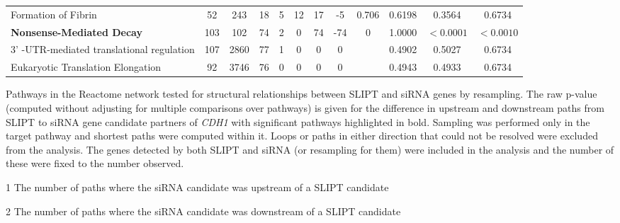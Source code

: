 \begin{table*}[!htb]
{{\begin{threeparttable}
\begin{tabular}{l|cc|cc|cccc|cc|c}
\rowcolor{black!10}
Formation of Fibrin                       & 52          & 243          & 18            & 5           & 12   & 17   & -5      & 0.706        & 0.6198             & 0.3564    & 0.6734            \\
\rowcolor{black!5}
\textbf{Nonsense-Mediated Decay}                   & 103         & 102          & 74            & 2           & 0    & 74   & -74     & 0            & 1.0000             & $<0.0001$  & $<0.0010$                \\
\rowcolor{black!10}
3' -UTR-mediated translational regulation & 107         & 2860         & 77            & 1           & 0    & 0    & 0       &              & 0.4902             & 0.5027   & 0.6734             \\
\rowcolor{black!5}
Eukaryotic Translation Elongation         & 92          & 3746         & 76            & 0           & 0    & 0    & 0       &              & 0.4943             & 0.4933   & 0.6734             \\
\hline
\end{tabular}
\begin{tablenotes}
\raggedright \small
Pathways in the Reactome network tested for structural relationships between \gls{SLIPT} and \gls{siRNA} genes by resampling. The raw p-value (computed without adjusting for multiple comparisons over \glspl{pathway}) is given for the difference in upstream and downstream paths from \gls{SLIPT} to \gls{siRNA} gene candidate partners of \textit{CDH1} with significant \glspl{pathway} highlighted in bold. Sampling was performed only in the target \gls{pathway} and \glspl{shortest path} were computed within it. Loops or paths in either direction that could not be resolved were excluded from the analysis. The genes detected by both \gls{SLIPT} and \gls{siRNA} (or resampling for them) were included in the analysis and the number of these were fixed to the number observed.

\item[1] The number of paths where the \gls{siRNA} candidate was upstream of a \gls{SLIPT} candidate

\item[2] The number of paths where the \gls{siRNA} candidate was downstream of a \gls{SLIPT} candidate
\end{tablenotes}
\end{threeparttable}
}
}
\end{table*}

